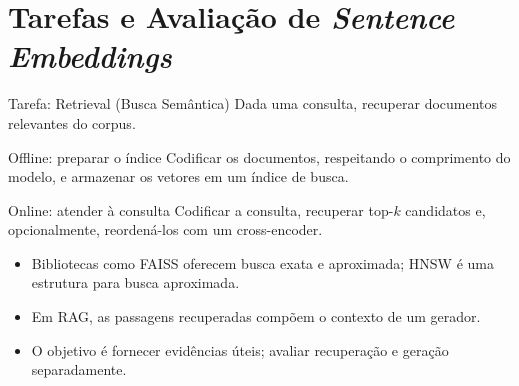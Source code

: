 \documentclass[aspectratio=169, xcolor=dvipsnames]{beamer}
\begin{document}
  \section{Tarefas e Avaliação de \textit{Sentence Embeddings}}

  \begin{frame}{Tarefa: Retrieval (Busca Semântica)}
    Dada uma consulta, recuperar documentos relevantes do corpus.
    \begin{block}{Offline: preparar o índice}
      Codificar os documentos, respeitando o comprimento do modelo,
      e armazenar os vetores em um índice de busca.
    \end{block}
    \begin{block}{Online: atender à consulta}
      Codificar a consulta, recuperar top-$k$ candidatos e, opcionalmente,
      reordená-los com um cross-encoder.
    \end{block}
    \begin{itemize}
      \item Bibliotecas como FAISS oferecem busca exata e aproximada;
      HNSW é uma estrutura para busca aproximada.
      \item Em RAG, as passagens recuperadas compõem o contexto de um gerador.
      \item O objetivo é fornecer evidências úteis; avaliar recuperação e geração separadamente.
    \end{itemize}
  \end{frame}
\end{document}
